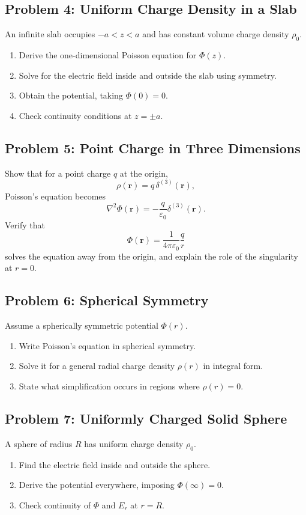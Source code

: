 \documentclass[hidelinks]{article}
\begin{document}
\subsection{Problem 4: Uniform Charge Density in a Slab}
An infinite slab occupies $-a<z<a$ and has constant volume charge density $\rho_0$.
\begin{enumerate}[label=\alph*)]
\item Derive the one-dimensional Poisson equation for $\Phi(z)$.
\item Solve for the electric field inside and outside the slab using symmetry.
\item Obtain the potential, taking $\Phi(0)=0$.
\item Check continuity conditions at $z=\pm a$.
\end{enumerate}

\subsection{Problem 5: Point Charge in Three Dimensions}
Show that for a point charge $q$ at the origin,
\[
\rho(\mathbf{r})=q\,\delta^{(3)}(\mathbf{r}),
\]
Poisson's equation becomes
\[
\nabla^2\Phi(\mathbf{r})=-\frac{q}{\varepsilon_0}\delta^{(3)}(\mathbf{r}).
\]
Verify that
\[
\Phi(\mathbf{r})=\frac{1}{4\pi\varepsilon_0}\frac{q}{r}
\]
solves the equation away from the origin, and explain the role of the singularity at $r=0$.

\subsection{Problem 6: Spherical Symmetry}
Assume a spherically symmetric potential $\Phi(r)$.
\begin{enumerate}[label=\alph*)]
\item Write Poisson's equation in spherical symmetry.
\item Solve it for a general radial charge density $\rho(r)$ in integral form.
\item State what simplification occurs in regions where $\rho(r)=0$.
\end{enumerate}

\subsection{Problem 7: Uniformly Charged Solid Sphere}
A sphere of radius $R$ has uniform charge density $\rho_0$.
\begin{enumerate}[label=\alph*)]
\item Find the electric field inside and outside the sphere.
\item Derive the potential everywhere, imposing $\Phi(\infty)=0$.
\item Check continuity of $\Phi$ and $E_r$ at $r=R$.
\end{enumerate}
\end{document}

